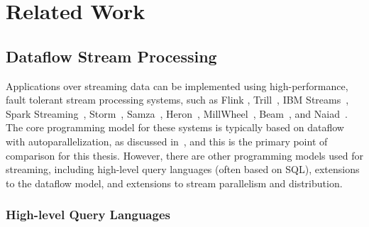 \chapter{Related Work}
\label{cha:rw}

\section{Dataflow Stream Processing}

Applications over streaming data can be implemented using
high-performance, fault tolerant stream processing systems, such as
Flink \cite{Flink2015,Flink2017,Flink}, Trill~\cite{chandramouli2014trill},
IBM Streams~\cite{HAG2013SPL},
Spark Streaming~\cite{Spark2013,SparkStreaming}, Storm~\cite{Storm},
Samza~\cite{Samza2017}, Heron~\cite{kulkarni2015twitter-heron,Heron},
MillWheel~\cite{MillWheel},
Beam~\cite{Beam},
and Naiad~\cite{Naiad2013,Timely}.
The core programming model for these systems is typically based on dataflow with autoparallelization, as discussed in~,
and this is the primary point of comparison for this thesis.
However, there are other programming models used for streaming, including
high-level query languages (often based on SQL),
extensions to the dataflow model,
and extensions to stream parallelism and distribution.


\subsection{High-level Query Languages}

